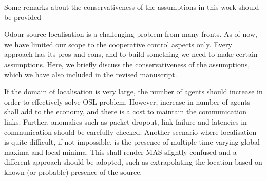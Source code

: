 \documentclass[10pt]{article}
\begin{document}
\begin{response}{Some remarks about the conservativeness of the assumptions in this work should be provided}

Odour source localisation is a challenging problem from many fronts. As of now, we have limited our scope to the cooperative control aspects only. Every approach has its pros and cons, and to build something we need to make certain assumptions. Here, we briefly discuss the conservativeness of the assumptions, which we have also included in the revised manuscript.

If the domain of localisation is very large, the number of agents should increase in order to effectively solve OSL problem. However, increase in number of agents shall add to the economy, and there is a cost to maintain the communication links. Further, anomalies such as packet dropout, link failure and latencies in communication should be carefully checked. Another scenario where localisation is quite difficult, if not impossible, is the presence of multiple time varying global maxima and local minima. This shall render MAS slightly confused and a different approach should be adopted, such as extrapolating the location based on known (or probable) presence of the source.
\end{response}
\end{document}

